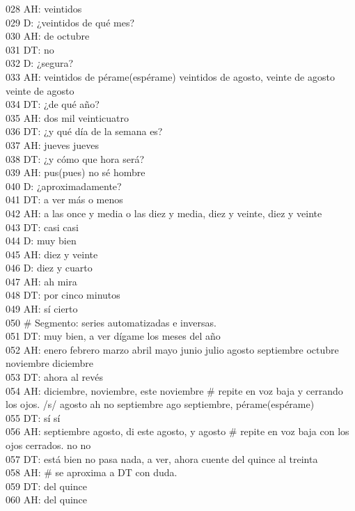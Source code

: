 028 AH: veintidos \\
029 D: ¿veintidos de qué mes?\\
030 AH: de octubre\\
031 DT: no\\
032 D: ¿segura?\\
033 AH: veintidos de pérame(espérame) veintidos de agosto, veinte de agosto veinte de agosto\\
034 DT: ¿de qué año?\\
035 AH: dos mil veinticuatro\\
036 DT: ¿y qué día de la semana es?\\
037 AH: jueves jueves\\
038 DT: ¿y cómo que hora será?\\
039 AH: pus(pues) no sé hombre\\
040 D: ¿aproximadamente?\\
041 DT: a ver más o menos\\
042 AH: a las once y media o las diez y media, diez y veinte, diez y veinte\\
043 DT: casi casi\\
044 D: muy bien\\
045 AH: diez y veinte\\
046 D: diez y cuarto\\
047 AH: ah mira\\
048 DT: por cinco minutos\\
049 AH: sí cierto\\
050 \# Segmento: series automatizadas e inversas.\\
051 DT: muy bien, a ver dígame los meses del año\\
052 AH: enero febrero marzo abril mayo junio julio agosto septiembre octubre noviembre diciembre\\
053 DT: ahora al revés\\
054 AH: diciembre, noviembre, este noviembre \# repite en voz baja y cerrando los ojos. /s/ agosto ah no septiembre ago septiembre, pérame(espérame)\\
055 DT: sí sí\\
056 AH: septiembre agosto, di este agosto, y agosto \# repite en voz baja con los ojos cerrados. no no\\
057 DT: está bien no pasa nada, a ver, ahora cuente del quince al treinta\\
058 AH: \# se aproxima a DT con duda.\\
059 DT: del quince\\
060 AH: del quince\\

